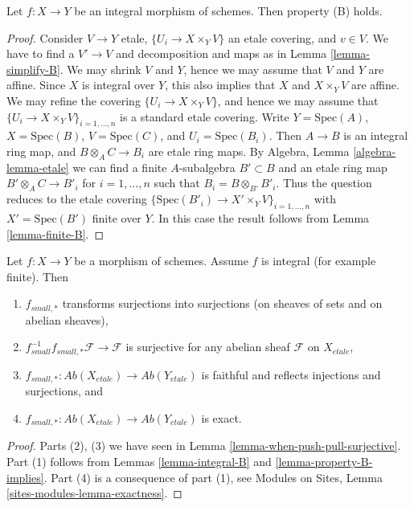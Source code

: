 \begin{lemma}
\label{lemma-integral-B}
Let $f : X \to Y$ be an integral morphism of schemes.
Then property (B) holds.
\end{lemma}

\begin{proof}
Consider $V \to Y$ etale, $\{U_i \to X \times_Y V\}$ an etale covering, and
$v \in V$. We have to find a $V' \to V$ and decomposition and maps as in
Lemma \ref{lemma-simplify-B}.
We may shrink $V$ and $Y$, hence we may assume that $V$ and $Y$ are affine.
Since $X$ is integral over $Y$, this also implies that $X$ and
$X \times_Y V$ are affine. We may refine the covering
$\{U_i \to X \times_Y V\}$, and hence we may assume that
$\{U_i \to X \times_Y V\}_{i = 1, \ldots, n}$ is a standard etale covering.
Write $Y = \text{Spec}(A)$, $X = \text{Spec}(B)$,
$V = \text{Spec}(C)$, and $U_i = \text{Spec}(B_i)$.
Then $A \to B$ is an integral ring map, and $B \otimes_A C \to B_i$ are
etale ring maps. By
Algebra, Lemma \ref{algebra-lemma-etale}
we can find a finite $A$-subalgebra $B' \subset B$ and an etale ring
map $B' \otimes_A C \to B'_i$ for $i = 1, \ldots, n$
such that $B_i = B \otimes_{B'} B'_i$. Thus the question
reduces to the etale covering
$\{\text{Spec}(B'_i) \to X' \times_Y V\}_{i = 1, \ldots, n}$
with $X' = \text{Spec}(B')$ finite over $Y$.
In this case the result follows from
Lemma \ref{lemma-finite-B}.
\end{proof}

\begin{lemma}
\label{lemma-what-integral}
Let $f : X \to Y$ be a morphism of schemes.
Assume $f$ is integral (for example finite).
Then
\begin{enumerate}
\item $f_{small, *}$ transforms surjections into surjections (on sheaves
of sets and on abelian sheaves),
\item $f_{small}^{-1}f_{small, *}\mathcal{F} \to \mathcal{F}$
is surjective for any abelian sheaf $\mathcal{F}$ on $X_{etale}$,
\item $f_{small, *} : \textit{Ab}(X_{etale}) \to \textit{Ab}(Y_{etale})$
is faithful and reflects injections and surjections, and
\item $f_{small, *} : \textit{Ab}(X_{etale}) \to \textit{Ab}(Y_{etale})$
is exact.
\end{enumerate}
\end{lemma}

\begin{proof}
Parts (2), (3) we have seen in
Lemma \ref{lemma-when-push-pull-surjective}.
Part (1) follows from
Lemmas \ref{lemma-integral-B} and \ref{lemma-property-B-implies}.
Part (4) is a consequence of part (1), see
Modules on Sites, Lemma \ref{sites-modules-lemma-exactness}.
\end{proof}









